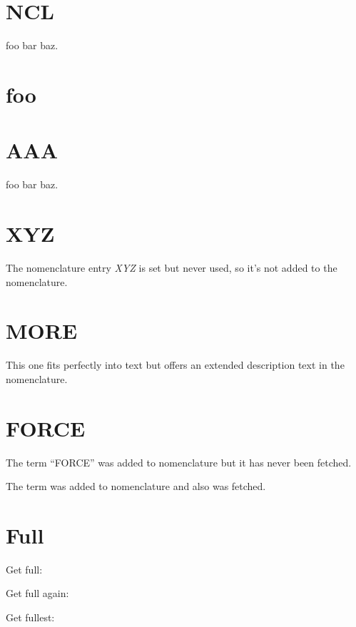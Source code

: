 \documentclass[12pt,oneside]{scrartcl}
\begin{document}
\printnomenclature
\newpage




\section{NCL}



foo bar  baz.

%

\section{foo}



%

\section{AAA}




foo bar  baz.

%

\section{XYZ}

The nomenclature entry \emph{XYZ} is set but never used, so it's not added to the nomenclature.

%

\section{MORE}

This one fits perfectly into text but offers an extended description text in the nomenclature.


%

\section{FORCE}

The term \enquote{FORCE} was added to nomenclature but it has never been fetched.

The term  was added to nomenclature and also was fetched.

%

\section{Full}

Get full: 

Get full again: 

Get fullest: 
\end{document}
